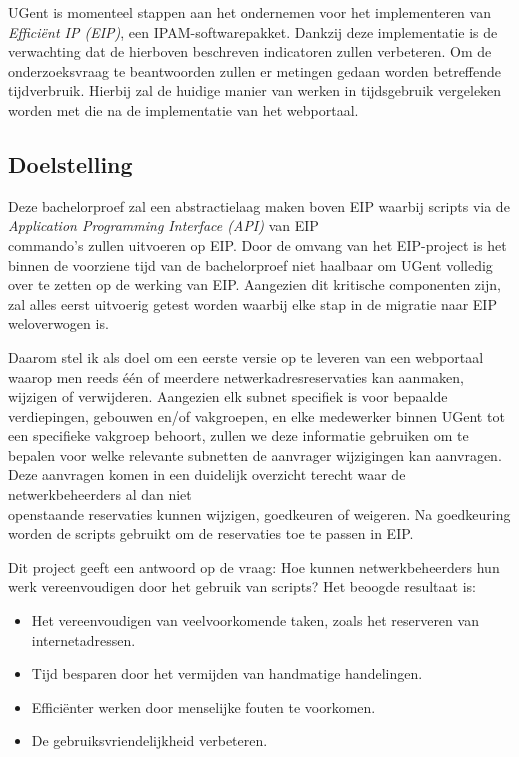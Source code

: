 \documentclass{hogent-article}
\begin{document}
UGent is momenteel stappen aan het ondernemen voor het implementeren van \textit{Efficiënt IP (EIP)}, een IPAM-softwarepakket. Dankzij deze implementatie is de verwachting dat de hierboven beschreven indicatoren zullen verbeteren. Om de onderzoeksvraag te beantwoorden zullen er metingen gedaan worden betreffende tijdverbruik. Hierbij zal de huidige manier van werken in tijdsgebruik vergeleken worden met die na de implementatie van het webportaal.

\subsection{Doelstelling}
\label{sec:doelstelling}
Deze bachelorproef zal een abstractielaag maken boven EIP waarbij scripts via de \textit{Application Programming Interface (API)} van EIP \\commando's zullen uitvoeren op EIP.
Door de omvang van het EIP-project is het binnen de voorziene tijd van de bachelorproef niet haalbaar om UGent volledig over te zetten op de werking van EIP. Aangezien dit kritische componenten zijn, zal alles eerst uitvoerig getest worden waarbij elke stap in de migratie naar EIP weloverwogen is.

Daarom stel ik als doel om een eerste versie op te leveren van een webportaal waarop men reeds één of meerdere netwerkadresreservaties kan aanmaken, wijzigen of verwijderen. Aangezien elk subnet specifiek is voor bepaalde verdiepingen, gebouwen en/of vakgroepen, en elke medewerker binnen UGent tot een specifieke vakgroep behoort, zullen we deze informatie gebruiken om te bepalen voor welke relevante subnetten de aanvrager wijzigingen kan aanvragen. Deze aanvragen komen in een duidelijk overzicht terecht waar de netwerkbeheerders al dan niet \\openstaande reservaties kunnen wijzigen, goedkeuren of weigeren. Na goedkeuring worden de scripts gebruikt om de reservaties toe te passen in EIP.

Dit project geeft een antwoord op de vraag: Hoe kunnen netwerkbeheerders hun werk vereenvoudigen door het gebruik van scripts?
Het beoogde resultaat is:
\begin{itemize}
    \item Het vereenvoudigen van veelvoorkomende taken, zoals het reserveren van internetadressen.
    \item Tijd besparen door het vermijden van handmatige handelingen.
    \item Efficiënter werken door menselijke fouten te voorkomen.
    \item De gebruiksvriendelijkheid verbeteren.
\end{itemize}
\end{document}

